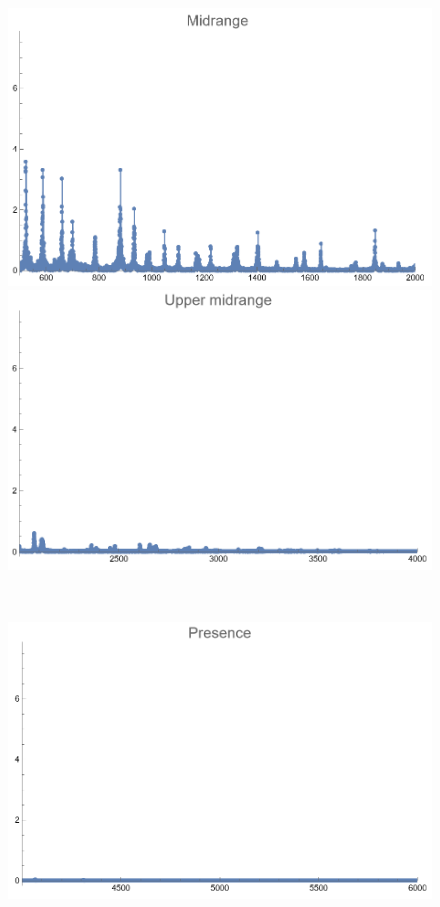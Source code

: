 \documentclass[12pt, letterpaper]{article}
\begin{document}
\begin{figure}[H]
\begin{minipage}{.3\textwidth}
  \end{minipage}
  \begin{minipage}{0.03\textwidth}\end{minipage}
  \begin{minipage}{.3\textwidth}
    \centering
    \includegraphics[width=.9\linewidth]{imgs/Cancion7/mid.png}
  \end{minipage}
  \begin{minipage}{0.03\textwidth}\end{minipage}
  \begin{minipage}{.3\textwidth}
    \centering
    \includegraphics[width=.9\linewidth]{imgs/Cancion7/upmid.png}
  \end{minipage} \medskip \\
  \begin{minipage}{.3\textwidth}
    \centering
    \includegraphics[width=.9\linewidth]{imgs/Cancion7/presence.png}

\end{minipage}
\end{figure}
\end{document}
